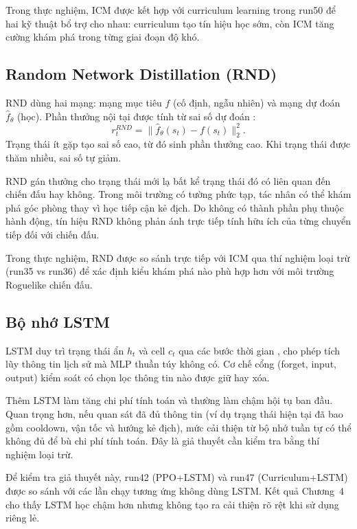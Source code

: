 Trong thực nghiệm, ICM được kết hợp với curriculum learning trong run50 để hai kỹ thuật bổ trợ cho nhau: curriculum tạo tín hiệu học sớm, còn ICM tăng cường khám phá trong từng giai đoạn độ khó.

\subsection{Random Network Distillation (RND)}

RND dùng hai mạng: mạng mục tiêu $f$ (cố định, ngẫu nhiên) và mạng dự đoán $\hat{f}_\theta$ (học). Phần thưởng nội tại được tính từ sai số dự đoán \cite{Burda2018}:
\begin{equation}
    r_t^{RND} = \|\hat{f}_\theta(s_t) - f(s_t)\|_2^2.
\end{equation}
Trạng thái ít gặp tạo sai số cao, từ đó sinh phần thưởng cao. Khi trạng thái được thăm nhiều, sai số tự giảm.

RND gán thưởng cho trạng thái mới lạ bất kể trạng thái đó có liên quan đến chiến đấu hay không. Trong môi trường có tường phức tạp, tác nhân có thể khám phá góc phòng thay vì học tiếp cận kẻ địch. Do không có thành phần phụ thuộc hành động, tín hiệu RND không phản ánh trực tiếp tính hữu ích của từng chuyển tiếp đối với chiến đấu.

Trong thực nghiệm, RND được so sánh trực tiếp với ICM qua thí nghiệm loại trừ (run35 vs run36) để xác định kiểu khám phá nào phù hợp hơn với môi trường Roguelike chiến đấu.

\subsection{Bộ nhớ LSTM}

LSTM duy trì trạng thái ẩn $h_t$ và cell $c_t$ qua các bước thời gian \cite{Hochreiter1997}, cho phép tích lũy thông tin lịch sử mà MLP thuần túy không có. Cơ chế cổng (forget, input, output) kiểm soát có chọn lọc thông tin nào được giữ hay xóa.

Thêm LSTM làm tăng chi phí tính toán và thường làm chậm hội tụ ban đầu. Quan trọng hơn, nếu quan sát đã đủ thông tin (ví dụ trạng thái hiện tại đã bao gồm cooldown, vận tốc và hướng kẻ địch), mức cải thiện từ bộ nhớ tuần tự có thể không đủ để bù chi phí tính toán. Đây là giả thuyết cần kiểm tra bằng thí nghiệm loại trừ.

Để kiểm tra giả thuyết này, run42 (PPO+LSTM) và run47 (Curriculum+LSTM) được so sánh với các lần chạy tương ứng không dùng LSTM. Kết quả Chương~4 cho thấy LSTM học chậm hơn nhưng không tạo ra cải thiện rõ rệt khi sử dụng riêng lẻ.

